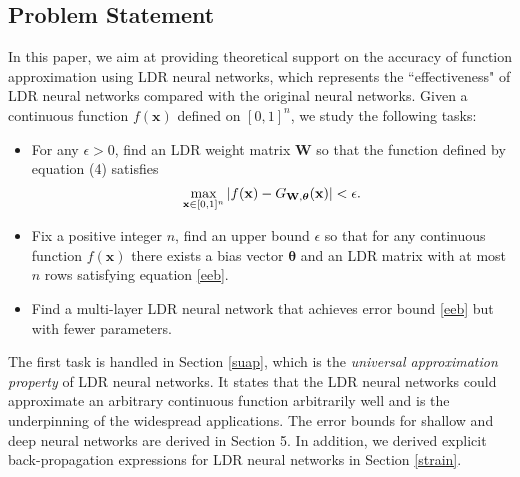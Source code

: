 \documentclass{article}
\begin{document}
\subsection{Problem Statement}
In this paper, we aim at providing theoretical support on the accuracy of function approximation using LDR neural networks, which represents the ``effectiveness" of LDR neural networks compared with the original neural networks. Given a continuous function $f(\textbf{x})$ defined on $[0,1]^n$, we study the following tasks:
\begin{itemize}
\item
For any $\epsilon>0$, find an LDR weight matrix $\textbf{W}$ so that the function defined by equation (4) satisfies
\begin{equation}
\label{eeb}
\max_{{\bf x}\in [0,1]^n}|f({\bf x}) - G_{\textrm{\bf{W}}, \bm{\theta}}({\bf x})|<\epsilon.
\end{equation}
\item
Fix a positive integer $n$, find an upper bound $\epsilon$ so that for any continuous function $f(\textbf{x})$ there exists a bias vector $\bm{\theta}$ and an LDR matrix with at most $n$ rows satisfying equation \eqref{eeb}.
\item
Find a multi-layer LDR neural network that achieves error bound \eqref{eeb} but with fewer parameters.
\end{itemize}
The first task is handled in Section \ref{suap}, which is the \emph{universal approximation property} of LDR neural networks. It states that the LDR neural networks could approximate an arbitrary continuous function arbitrarily well and is the underpinning of the widespread applications. The error bounds for shallow and deep neural networks are derived in Section 5. In addition, we derived explicit back-propagation expressions for LDR neural networks in Section \ref{strain}.
\end{document}
